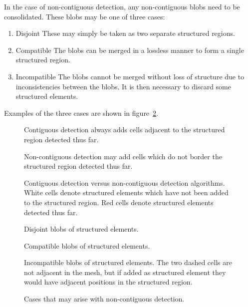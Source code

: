 In the case of non-contiguous detection, any non-contiguous blobs need to be consolidated. These blobs may be one of three cases:
\begin{enumerate}
\item Disjoint
These may simply be taken as two separate structured regions.

\item Compatible
The blobs can be merged in a lossless manner to form a single structured region.

\item Incompatible
The blobs cannot be merged without loss of structure due to inconsistencies between the blobs. It is then necessary to discard some structured elements.
\end{enumerate}

Examples of the three cases are shown in figure~\ref{fig:non-contiguous-detection}.


\begin{figure}

\sidebyside
{
	\drawmatrix[cell wd=0.6, cell ht=0.6]{\contiguousmatrix}
	\caption{Contiguous detection always adds cells adjacent to the structured region detected thus far.}
}
{
	\drawmatrix[cell wd=0.6, cell ht=0.6]{\noncontiguousmatrix}
	\caption{Non-contiguous detection may add cells which do not border the structured region detected thus far.}
}
\caption{Contiguous detection versus non-contiguous detection algorithms. White cells denote structured elements which have not been added to the structured region. Red cells denote structured elements detected thus far.\label{fig:contiguous-detection}}
\end{figure}

\begin{figure}
\sidebysidethreevertical
{
	
	\caption{Disjoint blobs of structured elements.}
}
{
	
	\caption{Compatible blobs of structured elements.}
}
{
	
	\caption{Incompatible blobs of structured elements. The two dashed cells are not adjacent in the mesh, but if added as structured element they would have adjacent positions in the structured region.}
}
\caption{Cases that may arise with non-contiguous detection.\label{fig:non-contiguous-detection}}
\end{figure}


